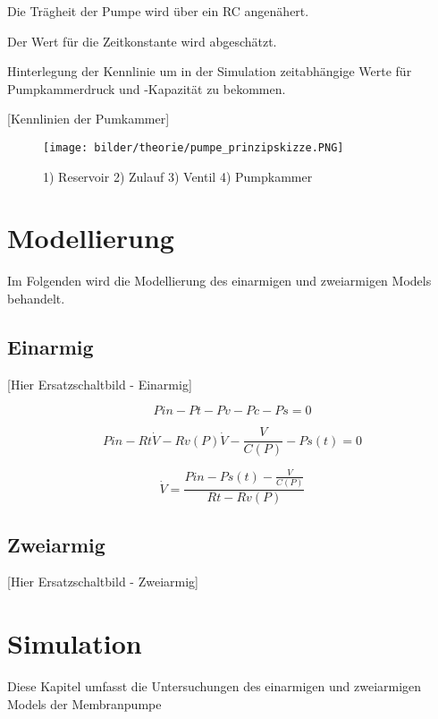 \documentclass[fontsize=12pt, a4paper]{scrartcl}
\let\stdsection\section 	%
\renewcommand\section{\newpage\stdsection}
\begin{document}
Die Trägheit der Pumpe wird über ein RC angenähert.

Der Wert für die Zeitkonstante wird abgeschätzt.

Hinterlegung der Kennlinie um in der Simulation zeitabhängige Werte für Pumpkammerdruck und -Kapazität zu bekommen.

[Kennlinien der Pumkammer]

\begin{figure}[H]
	\centering
	\texttt{[image: bilder/theorie/pumpe\_prinzipskizze.PNG]}
	\caption{1) Reservoir 2) Zulauf 3) Ventil 4) Pumpkammer}
\end{figure}


\section{Modellierung}

Im Folgenden wird die Modellierung des einarmigen und zweiarmigen Models behandelt.

\subsection{Einarmig}

[Hier Ersatzschaltbild - Einarmig]

\begin{center}
	
\end{center}


\[ Pin - Pt - Pv - Pc - Ps = 0 \]

\[ Pin - Rt\dot{V} - Rv(P)\dot{V} - \frac{V}{C(P)} - Ps(t) = 0 \]

\[ \dot{V} = \frac{Pin - Ps(t) - \frac{V}{C(P)}}{Rt - Rv(P)} \]


\subsection{Zweiarmig}

[Hier Ersatzschaltbild - Zweiarmig]

\begin{center}
	
\end{center}

\section{Simulation}

Diese Kapitel umfasst die Untersuchungen des einarmigen und zweiarmigen Models der Membranpumpe
\end{document}
